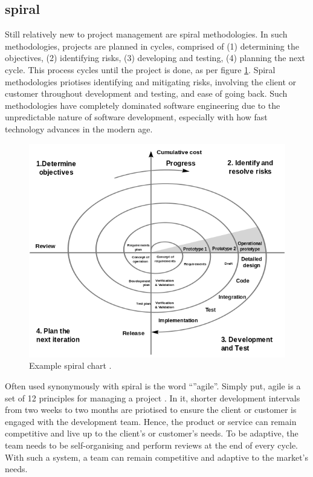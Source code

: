 \documentclass[11pt]{article}
\begin{document}
\subsection{\Gls{spiral}}

Still relatively new to project management are \gls{spiral} methodologies. In such methodologies, projects are planned in cycles, comprised of (1) determining the objectives, (2) identifying risks, (3) developing and testing, (4) planning the next cycle. This process cycles until the project is done, as per figure \ref{fig:spiral}. Spiral methodologies priotises identifying and mitigating risks, involving the client or customer throughout development and testing, and ease of going back. Such methodologies have completely dominated software engineering due to the unpredictable nature of software development, especially with how fast technology advances in the modern age.

\begin{figure}[h!]
    \centering
    \includegraphics[width=\textwidth]{figures/spiral_model.png}
    \caption{Example \gls{spiral} chart \cite{waterfall-vs-spiral}.}
    \label{fig:spiral}
\end{figure}

Often used synonymously with \gls{spiral} is the word ``''\gls{agile}''. Simply put, \gls{agile} is a set of 12 principles for managing a project \cite{agile-manifesto}. In it, shorter development intervals from two weeks to two months are priotised to ensure the client or customer is engaged with the development team. Hence, the product or service can remain competitive and live up to the client's or customer's needs. To be adaptive, the team needs to be self-organising and perform reviews at the end of every cycle. With such a system, a team can remain competitive and adaptive to the market's needs.
\end{document}
